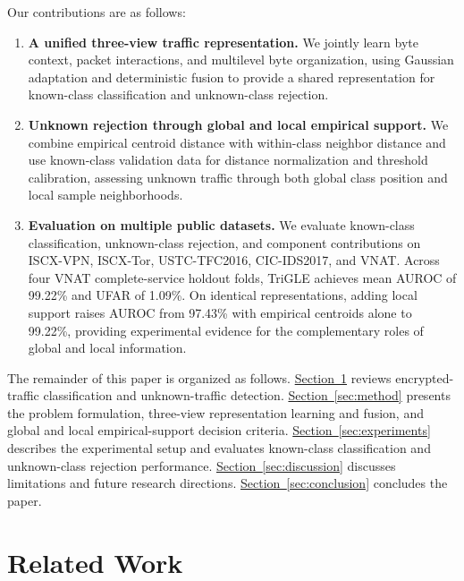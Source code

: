 \documentclass[journal]{IEEEtran}
\begin{document}
Our contributions are as follows:
\begin{enumerate}
\item \textbf{A unified three-view traffic representation.} We jointly learn byte context, packet interactions, and multilevel byte organization, using Gaussian adaptation and deterministic fusion to provide a shared representation for known-class classification and unknown-class rejection.
\item \textbf{Unknown rejection through global and local empirical support.} We combine empirical centroid distance with within-class neighbor distance and use known-class validation data for distance normalization and threshold calibration, assessing unknown traffic through both global class position and local sample neighborhoods.
\item \textbf{Evaluation on multiple public datasets.} We evaluate known-class classification, unknown-class rejection, and component contributions on ISCX-VPN, ISCX-Tor, USTC-TFC2016, CIC-IDS2017, and VNAT. Across four VNAT complete-service holdout folds, TriGLE achieves mean AUROC of 99.22\% and UFAR of 1.09\%. On identical representations, adding local support raises AUROC from 97.43\% with empirical centroids alone to 99.22\%, providing experimental evidence for the complementary roles of global and local information.
\end{enumerate}

The remainder of this paper is organized as follows. \hyperref[sec:related-work]{\mbox{Section~\ref*{sec:related-work}}} reviews encrypted-traffic classification and unknown-traffic detection. \hyperref[sec:method]{\mbox{Section~\ref*{sec:method}}} presents the problem formulation, three-view representation learning and fusion, and global and local empirical-support decision criteria. \hyperref[sec:experiments]{\mbox{Section~\ref*{sec:experiments}}} describes the experimental setup and evaluates known-class classification and unknown-class rejection performance. \hyperref[sec:discussion]{\mbox{Section~\ref*{sec:discussion}}} discusses limitations and future research directions. \hyperref[sec:conclusion]{\mbox{Section~\ref*{sec:conclusion}}} concludes the paper.

\section{Related Work}\label{sec:related-work}
\end{document}
